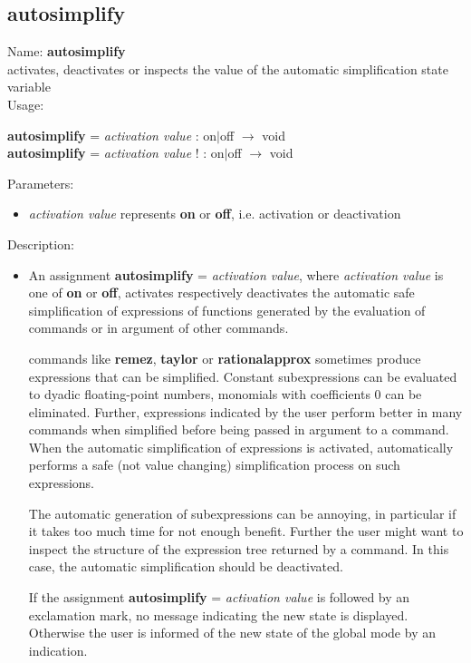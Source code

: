 \subsection{autosimplify}
\label{labautosimplify}
\noindent Name: \textbf{autosimplify}\\
activates, deactivates or inspects the value of the automatic simplification state variable\\
\noindent Usage: 
\begin{center}
\textbf{autosimplify} = \emph{activation value} : \textsf{on$|$off} $\rightarrow$ \textsf{void}\\
\textbf{autosimplify} = \emph{activation value} ! : \textsf{on$|$off} $\rightarrow$ \textsf{void}\\
\end{center}
Parameters: 
\begin{itemize}
\item \emph{activation value} represents \textbf{on} or \textbf{off}, i.e. activation or deactivation
\end{itemize}
\noindent Description: \begin{itemize}

\item An assignment \textbf{autosimplify} = \emph{activation value}, where \emph{activation value}
   is one of \textbf{on} or \textbf{off}, activates respectively deactivates the
   automatic safe simplification of expressions of functions generated by
   the evaluation of commands or in argument of other commands.
    
   \sollya commands like \textbf{remez}, \textbf{taylor} or \textbf{rationalapprox} sometimes
   produce expressions that can be simplified. Constant subexpressions
   can be evaluated to dyadic floating-point numbers, monomials with
   coefficients $0$ can be eliminated. Further, expressions
   indicated by the user perform better in many commands when simplified
   before being passed in argument to a command. When the automatic
   simplification of expressions is activated, \sollya automatically
   performs a safe (not value changing) simplification process on such
   expressions.
    
   The automatic generation of subexpressions can be annoying, in
   particular if it takes too much time for not enough benefit. Further the
   user might want to inspect the structure of the expression tree
   returned by a command. In this case, the automatic simplification
   should be deactivated.
    
   If the assignment \textbf{autosimplify} = \emph{activation value} is followed by an
   exclamation mark, no message indicating the new state is
   displayed. Otherwise the user is informed of the new state of the
   global mode by an indication.
\end{itemize}
